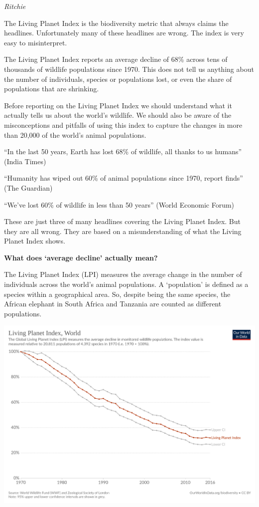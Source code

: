 \documentclass[
]{book}
\begin{document}
\emph{Ritchie}

The Living Planet Index is the biodiversity metric that always claims the headlines. Unfortunately many of these headlines are wrong. The index is very easy to misinterpret.

The Living Planet Index reports an average decline of 68\% across tens of thousands of wildlife populations since 1970. This does not tell us anything about the number of individuals, species or populations lost, or even the share of populations that are shrinking.

Before reporting on the Living Planet Index we should understand what it actually tells us about the world's wildlife. We should also be aware of the misconceptions and pitfalls of using this index to capture the changes in more than 20,000 of the world's animal populations.

``In the last 50 years, Earth has lost 68\% of wildlife, all thanks to us humans'' (India Times)

``Humanity has wiped out 60\% of animal populations since 1970, report finds'' (The Guardian)

``We've lost 60\% of wildlife in less than 50 years'' (World Economic Forum)

These are just three of many headlines covering the Living Planet Index. But they are all wrong. They are based on a misunderstanding of what the Living Planet Index shows.

\textbf{What does `average decline' actually mean?}

The Living Planet Index (LPI) measures the average change in the number of individuals across the world's animal populations. A `population' is defined as a species within a geographical area. So, despite being the same species, the African elephant in South Africa and Tanzania are counted as different populations.

\includegraphics{fig/global-living-planet-index.png}
\end{document}

